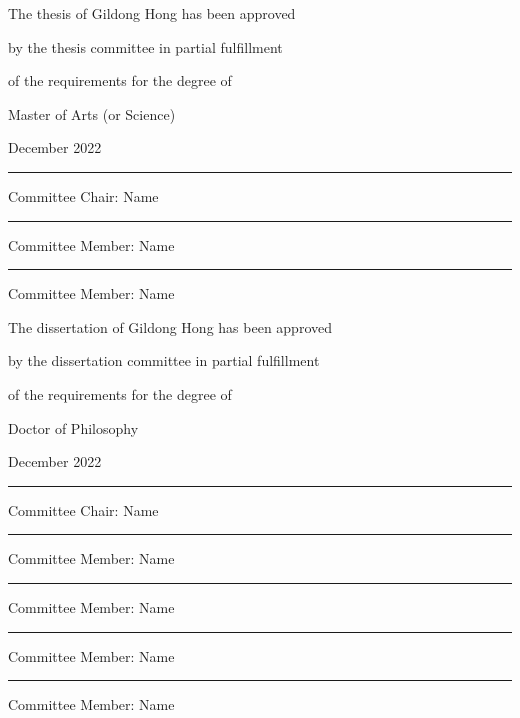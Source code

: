 \documentclass[11pt]{report}
\numberwithin{figure}{section}
\theoremstyle{plain}
\theoremstyle{definition}
\theoremstyle{corollary}
\theoremstyle{definition}
\theoremstyle{plain}
\theoremstyle{definition}
\theoremstyle{plain}
\begin{document}
\newpage %
\Large
The thesis of Gildong Hong has been approved \par
by the thesis committee in partial fulfillment\par
of the requirements for the degree of \par
Master of Arts (or Science)  
\par\vspace{1cm}
\large December 2022
\par\vspace{3cm}
\rule{.6\textwidth}{0.4pt}\par %
\Large
Committee Chair: Name
\par\vspace{1cm}
\rule{.6\textwidth}{0.4pt}\par %
Committee Member: Name
\par\vspace{1cm}
\rule{.6\textwidth}{0.4pt}\par %
Committee Member: Name 

\newpage
\begin{center}
\Large
The dissertation of Gildong Hong has been approved \par
by the dissertation committee in partial fulfillment\par
of the requirements for the degree of \par
Doctor of Philosophy  
\par\vspace{1cm}
\large December 2022
\par\vspace{2cm}
\rule{.6\textwidth}{0.4pt}\par %
\Large
Committee Chair: Name
\par\vspace{1cm}
\rule{.6\textwidth}{0.4pt}\par %
Committee Member: Name
\par\vspace{1cm}
\rule{.6\textwidth}{0.4pt}\par %
Committee Member: Name 
\par\vspace{1cm}
\rule{.6\textwidth}{0.4pt}\par %
Committee Member: Name 
\par\vspace{1cm}
\rule{.6\textwidth}{0.4pt}\par %
Committee Member: Name 
\par\vspace{1cm} %
\end{center}
\end{document}

